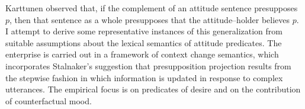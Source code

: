 Karttunen observed that, if the complement of an attitude sentence presupposes $p$, then that sentence as a whole presupposes that the attitude–holder believes $p$. I attempt to derive some representative instances of this generalization from suitable assumptions about the lexical semantics of attitude predicates. The enterprise is carried out in a framework of context change semantics, which incorporates Stalnaker's suggestion that presupposition projection results from the stepwise fashion in which information is updated in response to complex utterances. The empirical focus is on predicates of desire and on the contribution of counterfactual mood.
\endinput